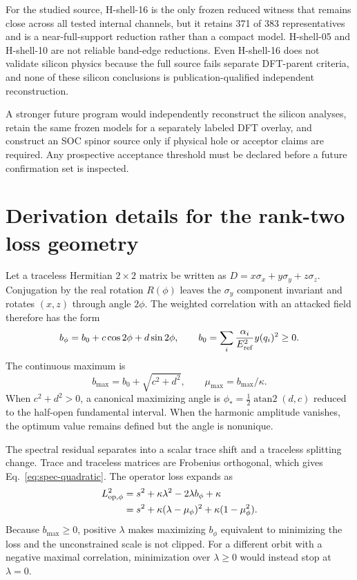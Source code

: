 \documentclass[11pt]{article}
\theoremstyle{definition}
\begin{document}
For the studied source, H-shell-16 is the only frozen reduced witness that remains close
across all tested internal channels, but it retains 371 of 383 representatives and is a
near-full-support reduction rather than a compact model.  H-shell-05 and H-shell-10 are
not reliable band-edge reductions.  Even H-shell-16 does not validate silicon physics
because the full source fails separate DFT-parent criteria, and none of these silicon
conclusions is publication-qualified independent reconstruction.

A stronger future program would independently reconstruct the silicon analyses, retain
the same frozen models for a separately labeled DFT overlay, and construct an SOC
spinor source only if physical hole or acceptor claims are required.  Any prospective
acceptance threshold must be declared before a future confirmation set is inspected.

\clearpage
\appendix

\section{Derivation details for the rank-two loss geometry}

Let a traceless Hermitian $2\times2$ matrix be written as
$D=x\sigma_x+y\sigma_y+z\sigma_z$.  Conjugation by the real rotation $R(\phi)$ leaves
the $\sigma_y$ component invariant and rotates $(x,z)$ through angle $2\phi$.  The
weighted correlation with an attacked field therefore has the form
\begin{equation}
 b_\phi=b_0+c\cos2\phi+d\sin2\phi,
 \qquad
 b_0=\sum_i\frac{\alpha_i}{E_{\rm ref}^2}y(q_i)^2\ge0.
\end{equation}
The continuous maximum is
\begin{equation}
 b_{\max}=b_0+\sqrt{c^2+d^2},\qquad
 \mu_{\max}=b_{\max}/\kappa.
\end{equation}
When $c^2+d^2>0$, a canonical maximizing angle is
$\phi_*=\tfrac12\operatorname{atan2}(d,c)$ reduced to the half-open fundamental
interval.  When the harmonic amplitude vanishes, the optimum value remains defined but
the angle is nonunique.

The spectral residual separates into a scalar trace shift and a traceless splitting
change.  Trace and traceless matrices are Frobenius orthogonal, which gives
Eq.~\eqref{eq:spec-quadratic}.  The operator loss expands as
\begin{align}
 L_{\rm op,\phi}^2
 &=s^2+\kappa\lambda^2-2\lambda b_\phi+\kappa\\
 &=s^2+\kappa(\lambda-\mu_\phi)^2
 +\kappa(1-\mu_\phi^2).
\end{align}
Because $b_{\max}\ge0$, positive $\lambda$ makes maximizing $b_\phi$ equivalent to
minimizing the loss and the unconstrained scale is not clipped.  For a different orbit
with a negative maximal correlation, minimization over $\lambda\ge0$ would instead stop
at $\lambda=0$.
\end{document}
